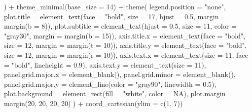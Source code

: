 \documentclass[
  letterpaper,
  DIV=11,
  numbers=noendperiod]{scrreprt}
\newenvironment{Shaded}{\begin{snugshade}}{\end{snugshade}}
\newcommand{\AttributeTok}[1]{\textcolor[rgb]{0.40,0.45,0.13}{#1}}
\newcommand{\ConstantTok}[1]{\textcolor[rgb]{0.56,0.35,0.01}{#1}}
\newcommand{\DecValTok}[1]{\textcolor[rgb]{0.68,0.00,0.00}{#1}}
\newcommand{\FloatTok}[1]{\textcolor[rgb]{0.68,0.00,0.00}{#1}}
\newcommand{\FunctionTok}[1]{\textcolor[rgb]{0.28,0.35,0.67}{#1}}
\newcommand{\NormalTok}[1]{\textcolor[rgb]{0.00,0.23,0.31}{#1}}
\newcommand{\SpecialCharTok}[1]{\textcolor[rgb]{0.37,0.37,0.37}{#1}}
\newcommand{\StringTok}[1]{\textcolor[rgb]{0.13,0.47,0.30}{#1}}
\begin{document}
\begin{Shaded}
\begin{Highlighting}[]
\NormalTok{  ) }\SpecialCharTok{+}
  \FunctionTok{theme\_minimal}\NormalTok{(}\AttributeTok{base\_size =} \DecValTok{14}\NormalTok{) }\SpecialCharTok{+}
  \FunctionTok{theme}\NormalTok{(}
    \AttributeTok{legend.position =} \StringTok{"none"}\NormalTok{,}
    \AttributeTok{plot.title =} \FunctionTok{element\_text}\NormalTok{(}\AttributeTok{face =} \StringTok{"bold"}\NormalTok{, }\AttributeTok{size =} \DecValTok{17}\NormalTok{, }\AttributeTok{hjust =} \FloatTok{0.5}\NormalTok{, }\AttributeTok{margin =} \FunctionTok{margin}\NormalTok{(}\AttributeTok{b =} \DecValTok{8}\NormalTok{)),}
    \AttributeTok{plot.subtitle =} \FunctionTok{element\_text}\NormalTok{(}\AttributeTok{hjust =} \FloatTok{0.5}\NormalTok{, }\AttributeTok{size =} \DecValTok{11}\NormalTok{, }\AttributeTok{color =} \StringTok{"gray30"}\NormalTok{, }\AttributeTok{margin =} \FunctionTok{margin}\NormalTok{(}\AttributeTok{b =} \DecValTok{15}\NormalTok{)),}
    \AttributeTok{axis.title.x =} \FunctionTok{element\_text}\NormalTok{(}\AttributeTok{face =} \StringTok{"bold"}\NormalTok{, }\AttributeTok{size =} \DecValTok{12}\NormalTok{, }\AttributeTok{margin =} \FunctionTok{margin}\NormalTok{(}\AttributeTok{t =} \DecValTok{10}\NormalTok{)),}
    \AttributeTok{axis.title.y =} \FunctionTok{element\_text}\NormalTok{(}\AttributeTok{face =} \StringTok{"bold"}\NormalTok{, }\AttributeTok{size =} \DecValTok{12}\NormalTok{, }\AttributeTok{margin =} \FunctionTok{margin}\NormalTok{(}\AttributeTok{r =} \DecValTok{10}\NormalTok{)),}
    \AttributeTok{axis.text.x =} \FunctionTok{element\_text}\NormalTok{(}\AttributeTok{size =} \DecValTok{11}\NormalTok{, }\AttributeTok{face =} \StringTok{"bold"}\NormalTok{, }\AttributeTok{lineheight =} \FloatTok{0.9}\NormalTok{),}
    \AttributeTok{axis.text.y =} \FunctionTok{element\_text}\NormalTok{(}\AttributeTok{size =} \DecValTok{11}\NormalTok{),}
    \AttributeTok{panel.grid.major.x =} \FunctionTok{element\_blank}\NormalTok{(),}
    \AttributeTok{panel.grid.minor =} \FunctionTok{element\_blank}\NormalTok{(),}
    \AttributeTok{panel.grid.major.y =} \FunctionTok{element\_line}\NormalTok{(}\AttributeTok{color =} \StringTok{"gray90"}\NormalTok{, }\AttributeTok{linewidth =} \FloatTok{0.5}\NormalTok{),}
    \AttributeTok{plot.background =} \FunctionTok{element\_rect}\NormalTok{(}\AttributeTok{fill =} \StringTok{"white"}\NormalTok{, }\AttributeTok{color =} \ConstantTok{NA}\NormalTok{),}
    \AttributeTok{plot.margin =} \FunctionTok{margin}\NormalTok{(}\DecValTok{20}\NormalTok{, }\DecValTok{20}\NormalTok{, }\DecValTok{20}\NormalTok{, }\DecValTok{20}\NormalTok{)}
\NormalTok{  ) }\SpecialCharTok{+}
  \FunctionTok{coord\_cartesian}\NormalTok{(}\AttributeTok{ylim =} \FunctionTok{c}\NormalTok{(}\DecValTok{1}\NormalTok{, }\DecValTok{7}\NormalTok{))}
\end{Highlighting}
\end{Shaded}
\end{document}
